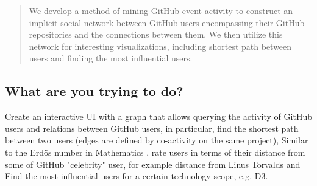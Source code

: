 \documentclass[sigconf,11pt]{acmart}
\begin{document}


\begin{abstract}
  We develop a method of mining GitHub event activity to construct an implicit social network
  between GitHub users encompassing their GitHub repositories and the connections between them.
  We then utilize this network for interesting visualizations, including shortest path between users
  and finding the most influential users.
\end{abstract}




\maketitle
\pagestyle{plain}

\subsection*{What are you trying to do?}
Create an interactive UI with a graph that allows querying the activity of GitHub users
and relations between GitHub users, in particular, find the shortest path between two users
(edges are defined by co-activity on the same project),
Similar to the Erdős number in Mathematics \cite{wiki:erdos}, rate users in terms of their
distance from some of GitHub "celebrity" user, for example distance from Linus Torvalds
and Find the most influential users for a certain technology scope, e.g. D3.
\end{document}
